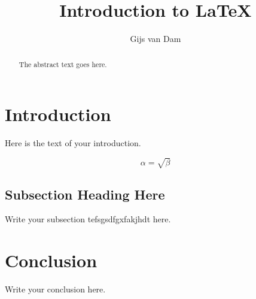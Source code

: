 \documentclass{article}
\begin{document}
    
    \title{Introduction to \LaTeX{}}
    \author{Gijs van Dam}
    
    \maketitle
    
    \begin{abstract}
    The abstract text goes here.
    \end{abstract}
    
    \section{Introduction}
    Here is the text of your introduction.
    
    \begin{equation}
        \label{simple_equation}
        \alpha = \sqrt{ \beta }
    \end{equation}
    
    \subsection{Subsection Heading Here}
    Write your subsection tefsgsdfgxfakjhdt here.
    
    \section{Conclusion}
    Write your conclusion here.
    
    
\end{document}

